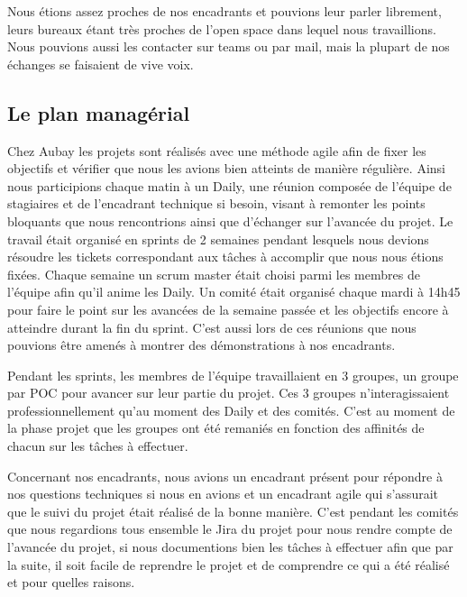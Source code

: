 \documentclass[11pt]{article}
\begin{document}
      Nous étions assez proches de nos encadrants et pouvions leur parler librement, leurs bureaux étant très 
      proches de l'open space dans lequel nous travaillions. Nous pouvions aussi les contacter sur teams ou 
      par mail, mais la plupart de nos échanges se faisaient de vive voix.

    \subsection{Le plan managérial}
      Chez Aubay les projets sont réalisés avec une méthode agile afin de fixer les objectifs et vérifier que nous les avions bien atteints
      de manière régulière. Ainsi nous participions chaque matin à un Daily, une réunion
      composée de l'équipe de stagiaires et de l'encadrant technique si besoin, 
      visant à remonter les points bloquants que nous rencontrions ainsi que d'échanger sur l'avancée du projet.
      Le travail était organisé en sprints de 2 semaines pendant lesquels nous devions résoudre les tickets
      correspondant aux tâches à accomplir que nous nous étions fixées. Chaque semaine un scrum master était
      choisi parmi les membres de l'équipe afin qu'il anime les Daily. Un comité était organisé chaque mardi
      à 14h45 pour faire le point sur les avancées de la semaine passée et les objectifs encore à atteindre
      durant la fin du sprint. C'est aussi lors de ces réunions que nous pouvions être amenés à montrer des 
      démonstrations à nos encadrants. 

      Pendant les sprints, les membres de l'équipe travaillaient en 3 groupes, un groupe par POC pour avancer 
      sur leur partie du projet. Ces 3 groupes n'interagissaient professionnellement qu'au moment des Daily
      et des comités. C'est au moment de la phase projet que les groupes ont été remaniés en fonction des
      affinités de chacun sur les tâches à effectuer.

      Concernant nos encadrants, nous avions un encadrant présent pour répondre à nos questions 
      techniques si nous en avions et un encadrant agile qui s'assurait que le suivi du projet était réalisé 
      de la bonne manière. C'est pendant les comités que nous regardions tous ensemble le Jira du projet pour nous
      rendre compte de l'avancée du projet, si nous documentions bien les tâches à effectuer afin que par la suite, 
      il soit facile de reprendre le projet et de comprendre ce qui a été réalisé et pour quelles raisons.

      \pagebreak
\end{document}
